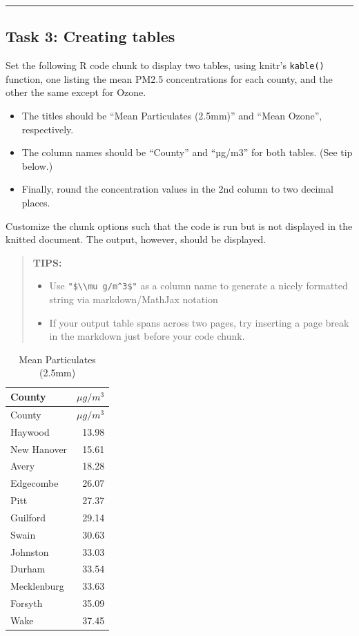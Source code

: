 \documentclass[
]{article}
\providecommand{\tightlist}{%
  \setlength{\itemsep}{0pt}\setlength{\parskip}{0pt}}
\begin{document}
\begin{center}\rule{0.5\linewidth}{0.5pt}\end{center}

\subsection{Task 3: Creating tables}\label{task-3-creating-tables}

Set the following R code chunk to display two tables, using knitr's
\texttt{kable()} function, one listing the mean PM2.5 concentrations for
each county, and the other the same except for Ozone.

\begin{itemize}
\tightlist
\item
  The titles should be ``Mean Particulates (2.5mm)'' and ``Mean Ozone'',
  respectively.
\item
  The column names should be ``County'' and ``µg/m3'' for both tables.
  (See tip below.)
\item
  Finally, round the concentration values in the 2nd column to two
  decimal places.
\end{itemize}

Customize the chunk options such that the code is run but is not
displayed in the knitted document. The output, however, should be
displayed.

\begin{quote}
\textbf{TIPS:}

\begin{itemize}
\item
  Use \texttt{"\$\textbackslash{}\textbackslash{}mu\ g/m\^{}3\$"} as a
  column name to generate a nicely formatted string via markdown/MathJax
  notation
\item
  If your output table spans across two pages, try inserting a page
  break in the markdown just before your code chunk.
\end{itemize}
\end{quote}

\begin{longtable}[]{@{}lr@{}}
\caption{Mean Particulates (2.5mm)}\tabularnewline
\toprule\noalign{}
County & \(\mu g/m^3\) \\
\midrule\noalign{}
\endfirsthead
\toprule\noalign{}
County & \(\mu g/m^3\) \\
\midrule\noalign{}
\endhead
\bottomrule\noalign{}
\endlastfoot
Haywood & 13.98 \\
New Hanover & 15.61 \\
Avery & 18.28 \\
Edgecombe & 26.07 \\
Pitt & 27.37 \\
Guilford & 29.14 \\
Swain & 30.63 \\
Johnston & 33.03 \\
Durham & 33.54 \\
Mecklenburg & 33.63 \\
Forsyth & 35.09 \\
Wake & 37.45 \\
\end{longtable}
\end{document}
